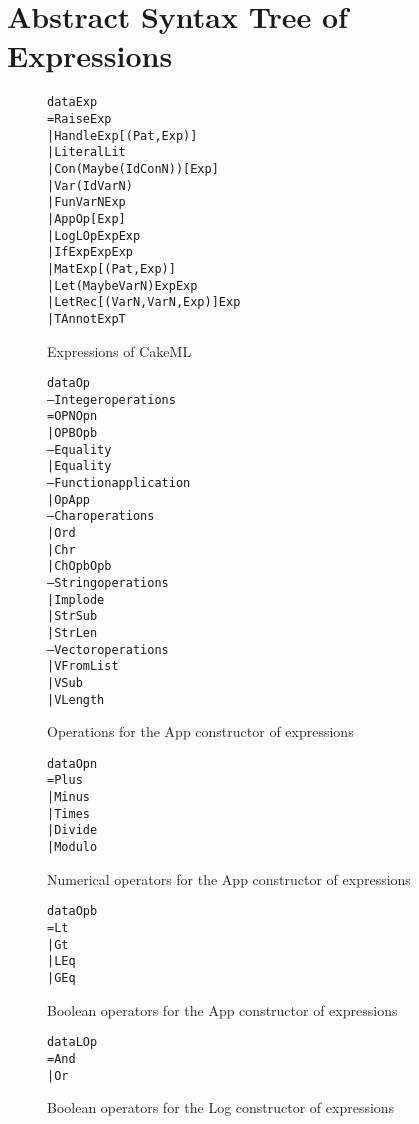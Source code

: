 \chapter{Abstract Syntax Tree of Expressions}
\label{app:ASTExp}

\begin{figure}
\begin{alltt}
data Exp
  = Raise Exp
  | Handle Exp [(Pat, Exp)]
  | Literal Lit
  | Con (Maybe (Id ConN)) [Exp]
  | Var (Id VarN)
  | Fun VarN Exp
  | App Op [Exp]
  | Log LOp Exp Exp
  | If Exp Exp Exp
  | Mat Exp [(Pat, Exp)]
  | Let (Maybe VarN) Exp Exp
  | LetRec [(VarN, VarN, Exp)] Exp
  | TAnnot Exp T
\end{alltt}
\caption{Expressions of CakeML}
\end{figure}

\begin{figure}
\begin{alltt}
data Op
  -- Integer operations
  = OPN Opn
  | OPB Opb
  -- Equality
  | Equality
  -- Function application
  | OpApp
  -- Char operations
  | Ord
  | Chr
  | ChOpb Opb
  -- String operations
  | Implode
  | StrSub
  | StrLen
  -- Vector operations
  | VFromList
  | VSub
  | VLength
\end{alltt}
\caption{Operations for the App constructor of expressions}
\end{figure}

\begin{figure}
\begin{alltt}
data Opn
  = Plus
  | Minus
  | Times
  | Divide
  | Modulo
\end{alltt}
\caption{Numerical operators for the App constructor of expressions}
\end{figure}

\begin{figure}
\begin{alltt}
data Opb
  = Lt
  | Gt
  | LEq
  | GEq
\end{alltt}
\caption{Boolean operators for the App constructor of expressions}
\end{figure}

\begin{figure}
\begin{alltt}
data LOp
  = And
  | Or
\end{alltt}
\caption{Boolean operators for the Log constructor of expressions}
\end{figure}
